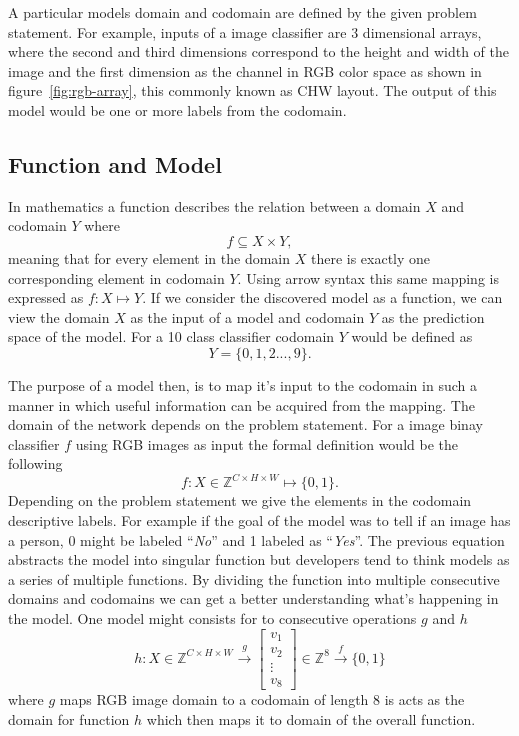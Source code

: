 \documentclass[12pt,a4paper,english
]{tunithesis}
\begin{document}
A particular models domain and codomain are defined by the given problem statement. For example, inputs of a image classifier are 3 dimensional arrays, where the second and third dimensions correspond to the height and width of the image and the first dimension as the channel in RGB color space as shown in figure~\ref{fig:rgb-array}, this commonly known as CHW layout.
The output of this model would be one or more labels from the codomain.


\subsection{Function and Model}
In mathematics a function describes the relation between a domain $X$ and codomain $Y$ where
\begin{equation}
  f \subseteq X \times Y,
\end{equation}
meaning that for every element in the domain $X$ there is exactly one corresponding element in codomain $Y$. Using arrow syntax this same mapping is expressed as $f : X \mapsto Y$. If we consider the discovered model as a function, we can view the domain $X$ as the input of a model and codomain $Y$ as the prediction space of the model. For a 10 class classifier codomain $Y$ would be defined as
\begin{equation}
  Y = \{0, 1, 2 ..., 9\}.
\end{equation}

The purpose of a model then, is to map it's input to the codomain in such a manner in which useful information can be acquired from the mapping.
The domain of the network depends on the problem statement. For a image binay classifier $f$ using RGB images as input the formal definition would be the following
\begin{equation}
  f: X \in \mathbb{Z}^{C \times H \times W} \mapsto \{0, 1\}.
\end{equation}
Depending on the problem statement we give the elements in the codomain descriptive labels. For example if the goal of the model was to tell if an image has a person, 0 might be labeled ``\emph{No}'' and 1 labeled as ``\emph{Yes}''. The previous equation abstracts the model into singular function but developers tend to think models as a series of multiple functions. By dividing the function into multiple consecutive domains and codomains we can get a better understanding what's happening in the model. One model might consists for to consecutive operations $g$ and $h$
\begin{equation}
  h: X \in \mathbb{Z}^{C \times H \times W} \xrightarrow{g}
  \begin{bmatrix} v_1 \\ v_2 \\ \vdots \\ v_8 \end{bmatrix}
  \in \mathbb{Z}^8 \xrightarrow{f} \{0, 1\}
\end{equation}
where $g$ maps RGB image domain to a codomain of length 8 is acts as the domain for function $h$ which then maps it to domain of the overall function.
\end{document}
